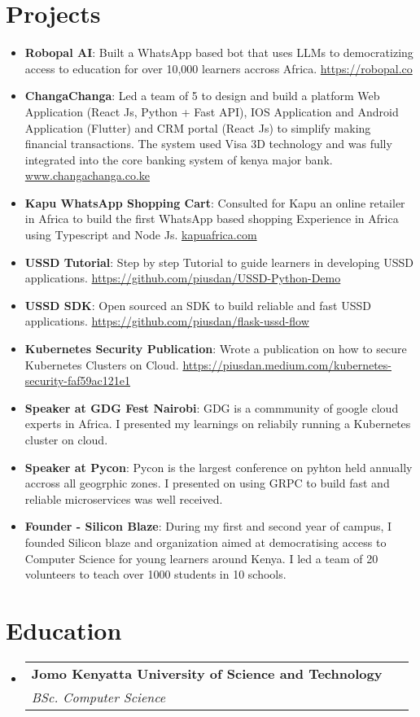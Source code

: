 \documentclass[letterpaper,11pt]{article}
\makeatletter
\newcommand{\resumeItem}[2]{
  \item\small{
    \textbf{#1}{: #2 \vspace{-2pt}}
  }
}
\newcommand{\resumeSubheading}[4]{
  \vspace{-1pt}\item
    \begin{tabular*}{0.97\textwidth}{l@{\extracolsep{\fill}}r}
      \textbf{#1} & #2 \\
      \textit{\small#3} & \textit{\small #4} \\
    \end{tabular*}\vspace{-5pt}
}
\newcommand{\resumeSubItem}[2]{\resumeItem{#1}{#2}\vspace{-4pt}}
\newcommand{\resumeSubHeadingListStart}{\begin{itemize}[leftmargin=*]}
\newcommand{\resumeSubHeadingListEnd}{\end{itemize}}
\makeatother
\begin{document}
\section{Projects}
  \resumeSubHeadingListStart  	
	  \resumeSubItem {Robopal AI}
	  {Built a WhatsApp based bot that uses LLMs to democratizing access to education for over 10,000 learners accross Africa. \href{https://robopal.co}{https://robopal.co}}
	\resumeSubItem {ChangaChanga}
	{Led a team of 5 to design and build a platform Web Application (React Js, Python + Fast API), IOS Application and Android Application (Flutter) and CRM portal (React Js) to simplify making financial transactions. The system used Visa 3D technology and was fully integrated into the core banking system of kenya major bank. \href{https://changachanga.co.ke}{www.changachanga.co.ke}}
\resumeSubItem{Kapu WhatsApp Shopping Cart}
{Consulted for Kapu an online retailer in Africa to build the first WhatsApp based shopping Experience in Africa using Typescript and Node Js. \href{https://kapuafrica.com}{kapuafrica.com}}
    \resumeSubItem{USSD Tutorial}
      {Step by step Tutorial to guide learners in developing USSD applications. \href{https://github.com/piusdan/USSD-Python-Demo}{https://github.com/piusdan/USSD-Python-Demo}}
    \resumeSubItem{USSD SDK}
      {Open sourced an SDK to build reliable and fast USSD applications. \href{https://github.com/piusdan/flask-ussd-flow}{https://github.com/piusdan/flask-ussd-flow}}
    \resumeSubItem{Kubernetes Security Publication}
      {Wrote a publication on how to secure Kubernetes Clusters on Cloud. \href{https://piusdan.medium.com/kubernetes-security-faf59ac121e1}{https://piusdan.medium.com/kubernetes-security-faf59ac121e1}}
  	\resumeSubItem{Speaker at GDG Fest Nairobi}
      {GDG is a commmunity of google cloud experts in Africa. I presented my learnings on reliabily running a Kubernetes cluster on cloud.}
  	\resumeSubItem{Speaker at Pycon}
      {Pycon is the largest conference on pyhton held annually accross all geogrphic zones. I presented on using GRPC to build fast and reliable microservices was well received.}
    \resumeSubItem{Founder - Silicon Blaze}
      {During my first and second year of campus, I founded Silicon blaze and organization aimed at democratising access to Computer Science for young learners around Kenya. I led a team of 20 volunteers to teach over 1000 students in 10 schools.}
  \resumeSubHeadingListEnd

\section{Education}
  \resumeSubHeadingListStart
    \resumeSubheading
      {Jomo Kenyatta University of Science and Technology}{}
      {BSc. Computer Science}\
  \resumeSubHeadingListEnd

\end{document}
